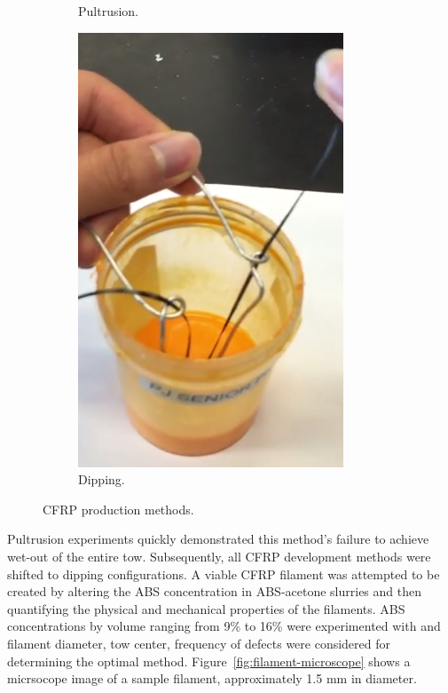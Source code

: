 \begin{figure}[t]
\begin{subfigure}[b]{0.4\linewidth}
                \caption{Pultrusion.}
                \label{fig:pultrusion-vid}
        \end{subfigure}
        \begin{subfigure}[b]{0.4\linewidth}
                \includegraphics[width=\linewidth]{./figures/dipping-vid}
                \caption{Dipping.}
                \label{fig:dipping-vid}
        \end{subfigure}
        \caption{CFRP production methods.}\label{fig:slurry-making}
\end{figure}

Pultrusion experiments quickly demonstrated this method's failure to achieve wet-out of the entire tow. Subsequently, all CFRP development methods were shifted to dipping configurations. A viable CFRP filament was attempted to be created by altering the ABS concentration in ABS-acetone slurries and then quantifying the physical and mechanical properties of the filaments. ABS concentrations by volume ranging from 9\% to 16\% were experimented with and filament diameter, tow center, frequency of defects were considered for determining the optimal method. Figure~\ref{fig:filament-microscope} shows a micrsocope image of a sample filament, approximately 1.5 mm in diameter.


